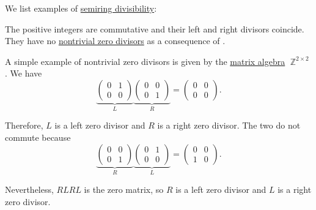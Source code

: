 \begin{example}\label{ex:def:divisibility}
  We list examples of \hyperref[def:divisibility]{semiring divisibility}:
  \begin{thmenum}
     The positive integers are commutative and their left and right divisors coincide. They have no \hyperref[def:divisibility/zero]{nontrivial zero divisors} as a consequence of .

     A simple example of nontrivial zero divisors is given by the \hyperref[thm:matrix_algebra]{matrix algebra} \( \BbbZ^{2 \times 2} \). We have
    \begin{equation*}
      \underbrace
      {
        \begin{pmatrix}
          0 & 1 \\
          0 & 0
        \end{pmatrix}
      }_{L}
      \underbrace
      {
        \begin{pmatrix}
          0 & 0 \\
          0 & 1
        \end{pmatrix}
      }_{R}
      =
      \begin{pmatrix}
        0 & 0 \\
        0 & 0
      \end{pmatrix}.
    \end{equation*}

    Therefore, \( L \) is a left zero divisor and \( R \) is a right zero divisor. The two do not commute because
    \begin{equation*}
      \underbrace
      {
        \begin{pmatrix}
          0 & 0 \\
          0 & 1
        \end{pmatrix}
      }_{R}
      \underbrace
      {
        \begin{pmatrix}
          0 & 1 \\
          0 & 0
        \end{pmatrix}
      }_{L}
      =
      \begin{pmatrix}
        0 & 0 \\
        1 & 0
      \end{pmatrix}.
    \end{equation*}

    Nevertheless, \( RLRL \) is the zero matrix, so \( R \) is a left zero divisor and \( L \) is a right zero divisor.


\end{thmenum}
\end{example}
